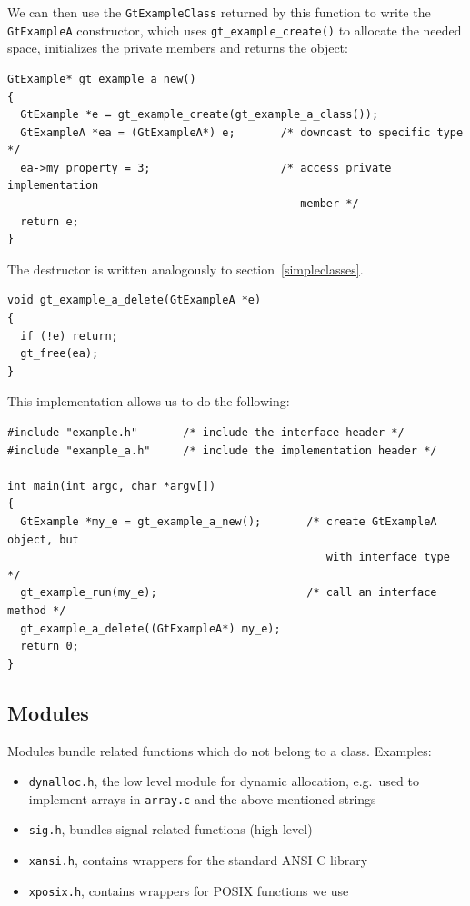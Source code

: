 \documentclass[11pt,final]{article}
\newcommand{\keyword}[1]{\lstinline{#1}}
\begin{document}
We can then use the \keyword{GtExampleClass} returned by this function to write
the \keyword{GtExampleA} constructor, which uses \keyword{gt_example_create()}
to allocate the needed space, initializes the private members and returns the
object:

\begin{lstlisting}
GtExample* gt_example_a_new()
{
  GtExample *e = gt_example_create(gt_example_a_class());
  GtExampleA *ea = (GtExampleA*) e;       /* downcast to specific type */
  ea->my_property = 3;                    /* access private implementation
                                             member */
  return e;
}
\end{lstlisting}

The destructor is written analogously to section~\ref{simpleclasses}.

\begin{lstlisting}
void gt_example_a_delete(GtExampleA *e)
{
  if (!e) return;
  gt_free(ea);
}
\end{lstlisting}

This implementation allows us to do the following:

\begin{lstlisting}
#include "example.h"       /* include the interface header */
#include "example_a.h"     /* include the implementation header */

int main(int argc, char *argv[])
{
  GtExample *my_e = gt_example_a_new();       /* create GtExampleA object, but
                                                 with interface type */
  gt_example_run(my_e);                       /* call an interface method */
  gt_example_a_delete((GtExampleA*) my_e);
  return 0;
}
\end{lstlisting}

\subsection{Modules}

Modules bundle related functions which do not belong to a class. Examples:
\begin{itemize}
\item
\keyword{dynalloc.h}, the low level module for dynamic allocation,
e.g.\ used to implement arrays in \keyword{array.c} and the
above-mentioned strings
\item
\keyword{sig.h}, bundles signal related functions (high level)
\item
\keyword{xansi.h}, contains wrappers for the standard ANSI C library
\item
\keyword{xposix.h}, contains wrappers for POSIX functions we use
\end{itemize}
\end{document}
